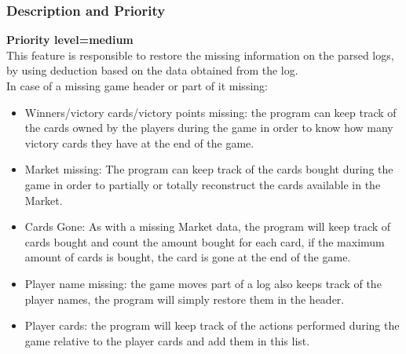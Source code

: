 \documentclass{scrreprt}
\begin{document}
\subsubsection{Description and Priority}
\textbf{Priority level=medium}\\
This feature is responsible to restore the missing information on the parsed
logs, by using deduction based on the data obtained from the log.\\
In case of a missing game header or part of it missing:
  \begin{itemize}
  \item Winners/victory cards/victory points missing: the program can keep track of the cards owned by the players during the game in order to know how many victory cards they have at the end of the game.
  \item Market missing: The program can keep track of the cards bought during the game in order to partially or totally reconstruct the cards available in the Market.
  \item Cards Gone: As with a missing Market data, the program will keep track of cards bought and count the amount bought for each card, if the maximum amount of cards is bought, the card is gone at the end of the game.
  \item Player name missing: the game moves part of a log also keeps track of the player names, the program will simply restore them in the header.
  \item Player cards: the program will keep track of the actions performed during the game relative to the player cards and add them in this list.
  \end{itemize}
\end{document}
